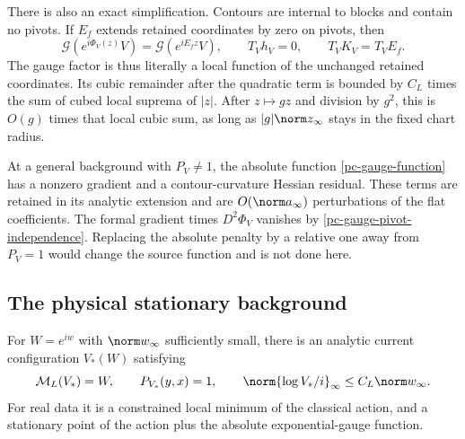 There is also an exact simplification. Contours are internal to
blocks and contain no pivots. If $E_f$ extends retained
coordinates by zero on pivots, then
\begin{equation}\label{pc-gauge-pivot-independence}
 \mathcal G(e^{i\Phi_V(z)}V)=\mathcal G(e^{iE_fz}V),\qquad
 T_Vh_V=0,\qquad T_VK_V=T_VE_f.
\end{equation}
The gauge factor is thus literally a local function of the
unchanged retained coordinates. Its cubic remainder after the
quadratic term is bounded by $C_L$ times the sum of cubed local
suprema of $|z|$. After $z\mapsto gz$ and division by $g^2$,
this is $O(g)$ times that local cubic sum, as long as
$|g|\norm z_\infty$ stays in the fixed chart radius.

At a general background with $P_V\ne1$, the absolute function
\eqref{pc-gauge-function} has a nonzero gradient and a
contour-curvature Hessian residual. These terms are retained in
its analytic extension and are $O(\norm a_\infty)$ perturbations
of the flat coefficients. The formal gradient times
$D^2\Phi_V$ vanishes by
\eqref{pc-gauge-pivot-independence}. Replacing the absolute
penalty by a relative one away from $P_V=1$ would change the
source function and is not done here.

\subsection{The physical stationary background}
\label{pc-stationary-section}

\begin{proposition}
\label{pc-stationary}
For $W=e^{iw}$ with $\norm w_\infty$ sufficiently small, there
is an analytic current configuration $V_*(W)$ satisfying
\begin{equation}\label{pc-stationary-identities}
 \mathcal M_L(V_*)=W,\qquad P_{V_*}(y,x)=1,\qquad
 \norm{\log V_*/i}_\infty\le C_L\norm w_\infty.
\end{equation}
For real data it is a constrained local minimum of the
classical action, and a stationary point of the action plus
the absolute exponential-gauge function.
\end{proposition}

